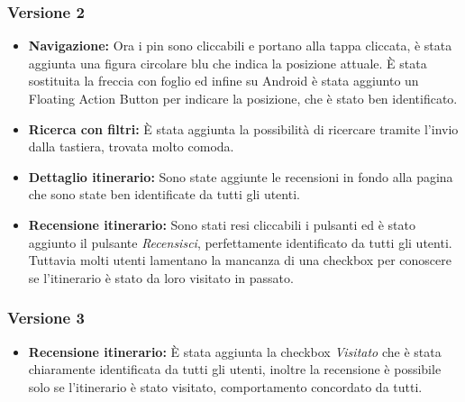 \subsubsection{Versione 2}

\begin{itemize}

\item \textbf{Navigazione:} Ora i pin sono cliccabili e portano alla tappa cliccata, è stata aggiunta una figura circolare blu che indica la posizione attuale. È stata sostituita la freccia con foglio ed infine su Android è stata aggiunto un Floating Action Button per indicare la posizione, che è stato ben identificato.

\item \textbf{Ricerca con filtri:} È stata aggiunta la possibilità di ricercare tramite l’invio dalla tastiera, trovata molto comoda.

\item \textbf{Dettaglio itinerario:} Sono state aggiunte le recensioni in fondo alla pagina che sono state ben identificate da tutti gli utenti.

\item \textbf{Recensione itinerario:} Sono stati resi cliccabili i pulsanti ed è stato aggiunto il pulsante \emph{Recensisci}, perfettamente identificato da tutti gli utenti. Tuttavia molti utenti lamentano la mancanza di una checkbox per conoscere se l'itinerario è stato da loro visitato in passato.

\end{itemize}

\subsubsection{Versione 3}

\begin{itemize}

\item \textbf{Recensione itinerario:} È stata aggiunta la checkbox \emph{Visitato} che è stata chiaramente identificata da tutti gli utenti, inoltre la recensione è possibile solo se l'itinerario è stato visitato, comportamento concordato da tutti.

\end{itemize}